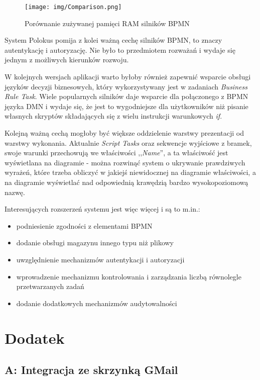 \documentclass[declaration,shortabstract,mgr]{iithesis}
\newcommand{\bpmn}{BPMN }
\newcommand{\bpmnnospace}{BPMN}
\begin{document}
\setlength{\belowcaptionskip}{-10pt}
\begin{figure}[H]
    \texttt{[image: img/Comparison.png]}
    \caption{Porównanie zużywanej pamięci RAM silników BPMN}
    \label{fig:comparison}
\end{figure}
\setlength{\belowcaptionskip}{0pt}

System Polokus pomija z kolei ważną cechę silników \bpmnnospace, to znaczy autentykację i autoryzację. Nie było to przedmiotem rozważań i wydaje się jednym z możliwych kierunków rozwoju.

W kolejnych wersjach aplikacji warto byłoby również zapewnić wsparcie obsługi języków decyzji biznesowych, który wykorzystywany jest w zadaniach \textit{Business Rule Task}. Wiele popularnych silników daje wsparcie dla połączonego z \bpmn języka DMN i wydaje się, że jest to wygodniejsze dla użytkowników niż pisanie własnych skryptów składających się z wielu instrukcji warunkowych \textit{if}. 

Kolejną ważną cechą mogłoby być większe oddzielenie warstwy prezentacji od warstwy wykonania. Aktualnie \textit{Script Tasks} oraz sekwencje wyjściowe z bramek, swoje warunki przechowują we właściwości ,,\textit{Name}'', a ta właściwość jest wyświetlana na diagramie - można rozwinąć system o ukrywanie prawdziwych wyrażeń, które trzeba obliczyć w jakiejś niewidocznej na diagramie właściwości, a na diagramie wyświetlać nad odpowiednią krawędzią bardzo wysokopoziomową nazwę.

Interesujących rozszerzeń systemu jest więc więcej i są to m.in.:
\vspace{-4mm}
\begin{itemize}
\setlength\itemsep{-0.4em}
\item podniesienie zgodności z elementami \bpmn
\item dodanie obsługi magazynu innego typu niż plikowy
\item uwzględnienie mechanizmów autentykacji i autoryzacji
\item wprowadzenie mechanizmu kontrolowania i zarządzania liczbą równolegle przetwarzanych zadań
\item dodanie dodatkowych mechanizmów audytowalności
\end{itemize}

\appendix
\setcounter{secnumdepth}{-1}
\chapter{Dodatek}
\section*{A: Integracja ze skrzynką GMail}
\end{document}

